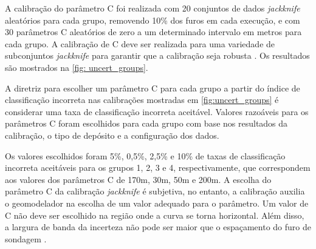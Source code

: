 \begin{figure}[H]
    \hspace{1em}
\end{figure}

A calibração do parâmetro C foi realizada com 20 conjuntos de dados \textit{jackknife} aleatórios para cada grupo, removendo 10\% dos furos em cada execução, e com 30 parâmetros C aleatórios de zero a um determinado intervalo em metros para cada grupo. A calibração de C deve ser realizada para uma variedade de subconjuntos \textit{jackknife} para garantir que a calibração seja robusta . Os resultados são mostrados na \autoref{fig: uncert_groups}.

A diretriz para escolher um parâmetro C para cada grupo a partir do índice de classificação incorreta nas calibrações mostradas em \autoref{fig:uncert_groups} é considerar uma taxa de classificação incorreta aceitável. Valores razoáveis para os parâmetros C foram escolhidos para cada grupo com base nos resultados da calibração, o tipo de depósito e a configuração dos dados.

Os valores escolhidos foram 5\%, 0,5\%, 2,5\% e 10\% de taxas de classificação incorreta aceitáveis para os grupos 1, 2, 3 e 4, respectivamente, que correspondem aos valores dos parâmetros C de 170m, 30m, 50m e 200m. A escolha do parâmetro C da calibração \textit{jackknife} é subjetiva, no entanto, a calibração auxilia o geomodelador na escolha de um valor adequado para o parâmetro. Um valor de C não deve ser escolhido na região onde a curva se torna horizontal. Além disso, a largura de banda da incerteza não pode ser maior que o espaçamento do furo de sondagem .

